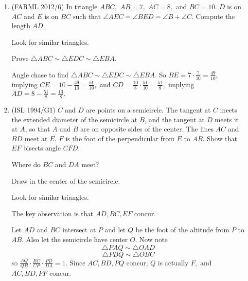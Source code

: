 \begin{enumerate}
    \item (FARML 2012/6) In triangle $ABC,$ $AB=7,$ $AC=8,$ and $BC=10.$ $D$ is on $AC$ and $E$ is on $BC$ such that $\angle AEC=\angle BED=\angle B+\angle C.$ Compute the length $AD.$
    \begin{hint}
    \begin{addhint}
    {Look for similar triangles.}
    \end{addhint}
    \begin{addhint}
    {Prove $\triangle ABC\sim \triangle EDC\sim \triangle EBA.$}
    \end{addhint}
    \end{hint}
    \begin{solu}
\begin{addsol}
{Angle chase to find $\triangle ABC\sim \triangle EDC\sim \triangle EBA.$ So $BE=7\cdot\frac{7}{10}=\frac{49}{10},$ implying $CE=10-\frac{49}{10}=\frac{51}{10},$ and $CD=\frac{10}{8}\cdot\frac{51}{10}=\frac{51}{8},$ implying $AD=8-\frac{51}{8}=\frac{13}{8}.$}
\end{addsol}
\end{solu}
    
    \item (ISL 1994/G1) $C$ and $D$ are points on a semicircle. The tangent at $C$ meets the extended diameter of the semicircle at $B$, and the tangent at $D$ meets it at $A$, so that $A$ and $B$ are on opposite sides of the center. The lines $AC$ and $BD$ meet at $E$. $F$ is the foot of the perpendicular from $E$ to $ AB$. Show that $EF$ bisects angle $CFD.$
    \begin{hint}
    \begin{addhint}
    {Where do $BC$ and $DA$ meet?}
    \end{addhint}
    \begin{addhint}
    {Draw in the center of the semicircle.}
    \end{addhint}
    \begin{addhint}
    {Look for similar triangles.}
    \end{addhint}
    \end{hint}
    \begin{solu}
    \begin{addsol}
    {The key observation is that $AD,BC,EF$ concur.
    
    Let $AD$ and $BC$ intersect at $P$ and let $Q$ be the foot of the altitude from $P$ to $AB.$ Also let the semicircle have center $O.$ Now note
    \[\triangle PAQ\sim \triangle OAD\]
    \[\triangle PBQ\sim \triangle OBC\]
    so $\frac{AQ}{QB}\cdot\frac{BC}{CP}\cdot\frac{PD}{DA}=1.$ Since $AC,BD,PQ$ concur, $Q$ is actually $F,$ and $AC,BD,PF$ concur.
    
}
\end{addsol}
\end{solu}
\end{enumerate}

